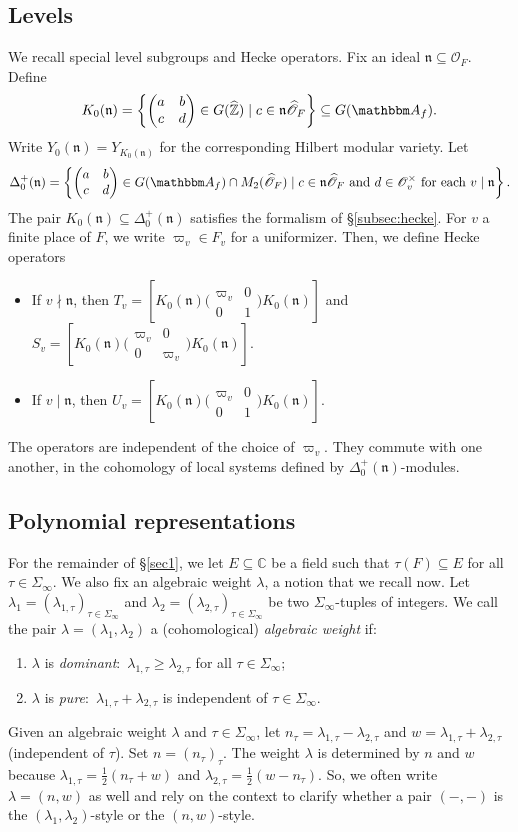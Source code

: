 \documentclass[10pt, twoside]{amsart}
\theoremstyle{plain}
\theoremstyle{definition}
\theoremstyle{remark}
\numberwithin{equation}{subsection}
\def\C{\mathbb C}
\def\Z{\mathbb Z}
\def\A{\mathbbm A}
\def\gn{\mathfrak n}
\def\scro{\mathscr O}
\def\scro{\mathscr O}
\newcommand{\mat}[4]{\begin{pmatrix}#1&#2\\#3&#4\end{pmatrix}}
\newcommand{\smallmat}[4]{\bigl(\begin{smallmatrix}#1&#2\\#3&#4\end{smallmatrix}\bigr)}
\begin{document}
\subsection{Levels}\label{subsec:levels}
We recall special level subgroups and Hecke operators. Fix an ideal $\gn \subseteq \scro_F$. Define
$$
K_0(\mathfrak n) = \left\{\mat abcd \in G(\widehat{\Z}) \mid c \in \mathfrak n \widehat{\scro}_F\right\} \subseteq G(\A_f).
$$ 
Write $Y_0(\gn) = Y_{K_0(\mathfrak n)}$ for the corresponding Hilbert modular variety. Let 
$$
\Delta_0^+(\gn) = \left\{\mat abcd \in G(\A_f) \cap M_2(\widehat{\scro}_F) \mid c \in \gn \widehat{\scro}_F \text{ and } d \in \scro_v^\times \text{ for each $v \mid \gn$}\right\}.
$$
The pair $K_0(\gn)\subseteq \Delta_0^+(\gn)$ satisfies the formalism of \S \ref{subsec:hecke}. For $v$ a finite place of $F$, we write $\varpi_v \in F_v$ for a uniformizer. Then, we define Hecke operators
\begin{itemize}
\item If $v \nmid \gn$, then $T_v = [K_0(\gn)\smallmat {\varpi_v}{0}{0}{1} K_0(\gn)]$ and $S_v = [K_0(\gn)\smallmat {\varpi_v}{0}{0}{\varpi_v} K_0(\gn)]$.
\item If $v \mid \gn$, then $U_v = [K_0(\gn)\smallmat {\varpi_v}{0}{0}{1} K_0(\gn)]$. 
\end{itemize}
The operators are independent of the choice of $\varpi_v$. They commute with one another, in the cohomology of local systems defined by $\Delta_0^+(\gn)$-modules.

\subsection{Polynomial representations}\label{subsec:polrep}
For the remainder of \S \ref{sec1}, we let $E \subseteq \C$ be a field such that $\tau(F) \subseteq E$ for all $\tau \in \Sigma_\infty$. We also fix an algebraic weight $\lambda$, a notion that we recall now. Let $\lambda_1 = (\lambda_{1,\tau})_{\tau \in \Sigma_\infty}$ and $\lambda_2 = (\lambda_{2,\tau})_{\tau \in \Sigma_\infty}$ be two $\Sigma_\infty$-tuples of integers. We call the pair $\lambda = (\lambda_1,\lambda_2)$ a (cohomological) {\em algebraic weight} if:
\begin{enumerate}[label=(\alph*)]
\item $\lambda$ is \emph{dominant}:\ $\lambda_{1,\tau} \geq \lambda_{2,\tau}$ for all $\tau \in \Sigma_\infty$;
\item $\lambda$ is \emph{pure}:\ $\lambda_{1,\tau} + \lambda_{2,\tau}$ is independent of $\tau \in \Sigma_\infty$.
\end{enumerate}
Given an algebraic weight $\lambda$ and $\tau \in \Sigma_\infty$, let $n_\tau = \lambda_{1,\tau} - \lambda_{2,\tau}$ and $w = \lambda_{1,\tau}+\lambda_{2,\tau}$ (independent of $\tau$). Set $n = (n_\tau)_\tau$. The weight $\lambda$ is determined by $n$ and $w$ because $\lambda_{1,\tau} = \frac{1}{2}(n_\tau+w)$ and $\lambda_{2,\tau} = \frac{1}{2}(w-n_\tau)$. So, we often write $\lambda = (n,w)$ as well and rely on the context to clarify whether a pair $(-,-)$ is the $(\lambda_1,\lambda_2)$-style or the $(n,w)$-style.
\end{document}
